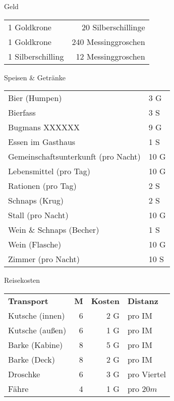 \documentclass{article}
\begin{document}
\pagebreak

\begin{multicols*}{3}

    \begin{slsframe}{Geld}
        \begin{tabularx}{\linewidth}{Xr}
            1 Goldkrone & 20 Silberschillinge   \\
            1 Goldkrone    & 240 Messinggroschen   \\
            1 Silberschilling    & 12 Messinggroschen   
        \end{tabularx}
    \end{slsframe}

    \begin{slsframe}{Speisen \& Getränke}
        \begin{tabularx}{0.95\linewidth}{Xl}
            Bier (Humpen)                       & 3 G            \\ 
            Bierfass                            & 3 S            \\ 
            Bugmans XXXXXX                      & 9 G            \\ 
            Essen im Gasthaus                   & 1 S            \\ 
            Gemeinschaftsunterkunft (pro Nacht) & 10 G           \\ 
            Lebensmittel (pro Tag)              & 10 G           \\ 
            Rationen (pro Tag)                  & 2 S            \\ 
            Schnaps (Krug)                      & 2 S            \\ 
            Stall (pro Nacht)                   & 10 G           \\ 
            Wein \& Schnaps (Becher)            & 1 S            \\ 
            Wein (Flasche)                      & 10 G           \\ 
            Zimmer (pro Nacht)                  & 10 S               
        \end{tabularx}%
    \end{slsframe}

    \begin{slsframe}{Reisekosten}
        \begin{tabularx}{\linewidth}{Xrrl}
            \textbf{Transport} & \textbf{M} & \textbf{Kosten} & \textbf{Distanz} \\
            Kutsche (innen) & 6 & 2 G & pro IM  \\
            Kutsche (außen) & 6 & 1 G & pro IM  \\
            Barke (Kabine) & 8  & 5 G & pro IM  \\
            Barke (Deck) & 8    & 2 G & pro IM  \\
            Droschke & 6        & 3 G & pro Viertel  \\
            Fähre & 4           & 1 G & pro $20m$  
        \end{tabularx}
    \end{slsframe}



\end{multicols*}
\end{document}
